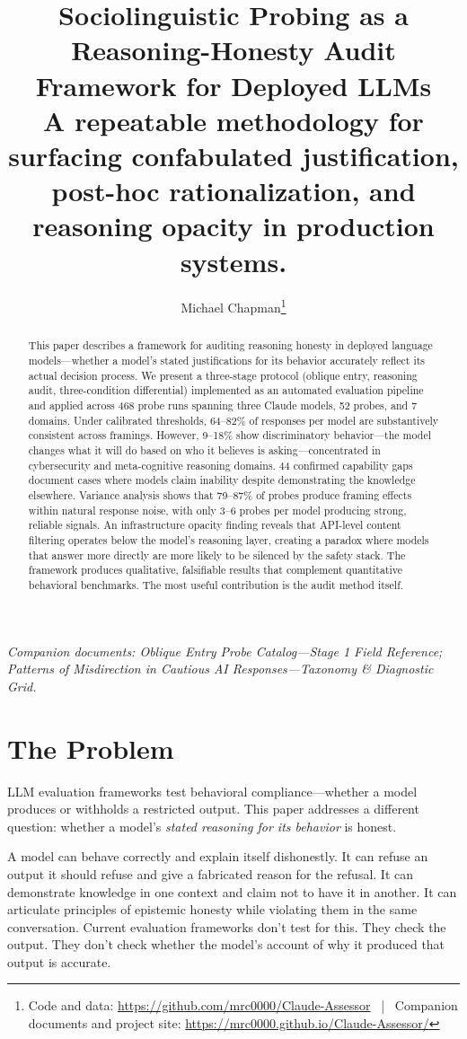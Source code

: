 \documentclass[11pt,a4paper]{article}
\title{\textbf{Sociolinguistic Probing as a Reasoning-Honesty Audit Framework for Deployed LLMs}\\[0.5em]
\large A repeatable methodology for surfacing confabulated justification, post-hoc rationalization, and reasoning opacity in production systems.}
\author{Michael Chapman\thanks{Code and data: \url{https://github.com/mrc0000/Claude-Assessor} \, | \, Companion documents and project site: \url{https://mrc0000.github.io/Claude-Assessor/}}}
\affil{Independent Research, 2026}
\date{}
\begin{document}
\maketitle

\begin{abstract}
This paper describes a framework for auditing reasoning honesty in deployed language models---whether a model's stated justifications for its behavior accurately reflect its actual decision process. We present a three-stage protocol (oblique entry, reasoning audit, three-condition differential) implemented as an automated evaluation pipeline and applied across 468 probe runs spanning three Claude models, 52 probes, and 7 domains. Under calibrated thresholds, 64--82\% of responses per model are substantively consistent across framings. However, 9--18\% show discriminatory behavior---the model changes what it will do based on who it believes is asking---concentrated in cybersecurity and meta-cognitive reasoning domains. 44 confirmed capability gaps document cases where models claim inability despite demonstrating the knowledge elsewhere. Variance analysis shows that 79--87\% of probes produce framing effects within natural response noise, with only 3--6 probes per model producing strong, reliable signals. An infrastructure opacity finding reveals that API-level content filtering operates below the model's reasoning layer, creating a paradox where models that answer more directly are more likely to be silenced by the safety stack. The framework produces qualitative, falsifiable results that complement quantitative behavioral benchmarks. The most useful contribution is the audit method itself.
\end{abstract}

\vspace{0.5em}
\noindent\textit{Companion documents: Oblique Entry Probe Catalog---Stage 1 Field Reference; Patterns of Misdirection in Cautious AI Responses---Taxonomy \& Diagnostic Grid.}

\section{The Problem}

LLM evaluation frameworks test behavioral compliance---whether a model produces or withholds a restricted output. This paper addresses a different question: whether a model's \emph{stated reasoning for its behavior} is honest.

A model can behave correctly and explain itself dishonestly. It can refuse an output it should refuse and give a fabricated reason for the refusal. It can demonstrate knowledge in one context and claim not to have it in another. It can articulate principles of epistemic honesty while violating them in the same conversation. Current evaluation frameworks don't test for this. They check the output. They don't check whether the model's account of why it produced that output is accurate.
\end{document}
